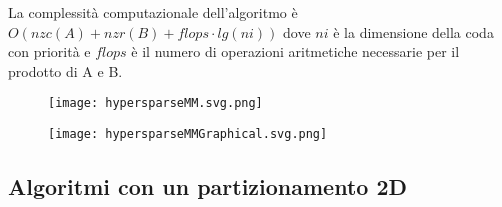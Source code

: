 La complessità computazionale dell'algoritmo è $O(nzc(A) + nzr(B) +flops \cdot lg( ni))$
dove $ni$ è la dimensione della coda con priorità e $flops$ è il numero di
operazioni aritmetiche necessarie per il prodotto di A e B.\\

\begin{figure}[h!]
  \centering \texttt{[image: hypersparseMM.svg.png]}
  \caption[Algoritmo sequenziale per SpMM tra matrici ipersparse] \decoRule \label{figCode:hypersparseMM}
\end{figure}

\begin{figure}[h!]
  \centering \texttt{[image: hypersparseMMGraphical.svg.png]}
  \caption[Rappresentazione grafica del prodotto cartesiano 
   a supporto di hypersparseMM ] \decoRule \label{fig:hypersparseMMGraphical}
\end{figure}


\subsection{Algoritmi con un partizionamento 2D}

